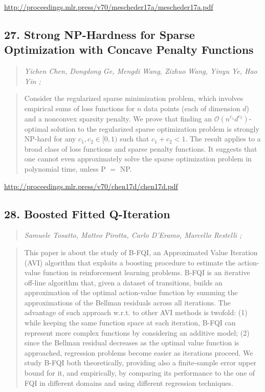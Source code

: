 \documentclass{article}
\begin{document}
\href{http://proceedings.mlr.press/v70/mescheder17a/mescheder17a.pdf}{http://proceedings.mlr.press/v70/mescheder17a/mescheder17a.pdf}

\subsection{27. Strong NP-Hardness for Sparse Optimization with Concave Penalty Functions}

\begin{quote}
\footnotesize{\textit{Yichen Chen, Dongdong Ge, Mengdi Wang, Zizhuo Wang, Yinyu Ye, Hao Yin ;}}

\end{quote}

\begin{quote}
    Consider the regularized sparse minimization problem, which involves empirical sums of loss functions for $n$ data points (each of dimension $d$) and a nonconvex sparsity penalty. We prove that finding an $\mathcal{O}(n^{c_1}d^{c_2})$-optimal solution to the regularized sparse optimization problem is strongly NP-hard for any $c_1, c_2\in [0,1)$ such that $c_1+c_2<1$. The result applies to a broad class of loss functions and sparse penalty functions. It suggests that one cannot even approximately solve the sparse optimization problem in polynomial time, unless P $=$ NP.  
\end{quote}

\href{http://proceedings.mlr.press/v70/chen17d/chen17d.pdf}{http://proceedings.mlr.press/v70/chen17d/chen17d.pdf}

\subsection{28. Boosted Fitted Q-Iteration}

\begin{quote}
\footnotesize{\textit{Samuele Tosatto, Matteo Pirotta, Carlo D’Eramo, Marcello Restelli ;}}

\end{quote}

\begin{quote}
    This paper is about the study of B-FQI, an Approximated Value Iteration (AVI) algorithm that exploits a boosting procedure to estimate the action-value function in reinforcement learning problems. B-FQI is an iterative off-line algorithm that, given a dataset of transitions, builds an approximation of the optimal action-value function by summing the approximations of the Bellman residuals across all iterations. The advantage of such approach w.r.t. to other AVI methods is twofold: (1) while keeping the same function space at each iteration, B-FQI can represent more complex functions by considering an additive model; (2) since the Bellman residual decreases as the optimal value function is approached, regression problems become easier as iterations proceed. We study B-FQI both theoretically, providing also a finite-sample error upper bound for it, and empirically, by comparing its performance to the one of FQI in different domains and using different regression techniques.  
\end{quote}
\end{document}
